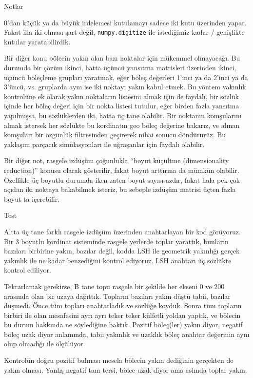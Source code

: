 \documentclass[12pt,fleqn]{article}\usepackage{../../common}
\begin{document}
Notlar

0'dan küçük ya da büyük irdelemesi kutulamayı sadece iki kutu üzerinden
yapar. Fakat illa iki olması şart değil, \verb!numpy.digitize! ile istediğimiz
kadar / genişlikte kutular yaratabilirdik.

Bir diğer konu bölecin yakın olan bazı noktalar için mükemmel olmayacağı. Bu
durumda bir çözüm ikinci, hatta üçüncü yansıtma matrisleri üzerinden ikinci,
üçüncü böleçleme grupları yaratmak, eğer böleç değerleri 1'inci ya da 2'inci ya
da 3'üncü, vs. gruplarda aynı ise iki noktayı yakın kabul etmek. Bu yöntem
yakınlık kontrolüne ek olarak yakın noktaların listesini almak için de faydalı,
bir sözlük içinde her böleç değeri için bir nokta listesi tutulur, eğer birden
fazla yansıtma yapılmışsa, bu sözlüklerden iki, hatta üç tane olabilir. Bir
noktanın komşularını almak istersek her sözlükte bu kordinatın geo böleç
değerine bakarız, ve alınan komşuları bir özgünlük filtresinden geçirerek nihai
sonucu döndürürüz. Bu yaklaşım parçacık simülasyonları ile uğraşanlar için
faydalı olabilir.

Bir diğer not, rasgele izdüşüm çoğunlukla ``boyut küçültme (dimensionality
reduction)'' konusu olarak gösterilir, fakat boyut arttırma da mümkün
olabilir. Özellikle üç boyutlu durumda iken zaten boyut sayısı azdır, fakat hala
pek çok açıdan iki noktaya bakabilmek isteriz, bu sebeple izdüşüm matrisi üçten
fazla boyut ta içerebilir.

Test

Altta üç tane farklı rasgele izdüşüm üzerinden anahtarlayan bir kod
görüyoruz. Bir 3 boyutlu kordinat sisteminde rasgele yerlerde toplar yarattık,
bunların bazıları birbirine yakın, bazılar değil, kodda LSH ile geometrik
yakınlığı gerçek yakınlık ile ne kadar benzediğini kontrol ediyoruz. LSH
anahtarı üç sözlükte kontrol ediliyor.

Tekrarlamak gerekirse, B tane topu rasgele bir şekilde her ekseni 0 ve 200
arasında olan bir uzaya dağıttık. Topların bazıları yakın düştü tabii, bazılar
düşmedi. Önce tüm topları anahtarladık ve sözlüğe koyduk. Sonra tüm topların
birbiri ile olan mesafesini ayrı ayrı teker teker külfetli yoldan yaptık, ve
bölecin bu durum hakkında ne söylediğine baktık. Pozitif böleç(ler) yakın diyor,
negatif böleç uzak diyor anlamında, tabii yakınlık ve uzaklık böleç anahtar
değerinin aynı olup olmadığı ile ölçülüyor.

Kontrolün doğru pozitif bulması mesela bölecin yakın dediğinin gerçekten de
yakın olması. Yanlış negatif tam tersi, bölec uzak diyor ama aslında toplar
yakın.
\end{document}
